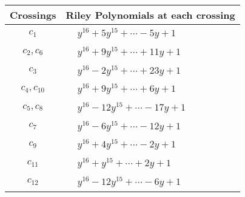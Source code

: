 \documentclass[1p]{elsarticle_modified}
\theoremstyle{definition}
\begin{document}
\begin{tabular}{m{50pt}|m{274pt}}
Crossings & \hspace{64pt}Riley Polynomials at each crossing \\
\hline $$\begin{aligned}c_{1}\end{aligned}$$&$\begin{aligned}
&y^{16}+5 y^{15}+\cdots-5 y+1
\end{aligned}$\\
\hline $$\begin{aligned}c_{2},c_{6}\end{aligned}$$&$\begin{aligned}
&y^{16}+9 y^{15}+\cdots+11 y+1
\end{aligned}$\\
\hline $$\begin{aligned}c_{3}\end{aligned}$$&$\begin{aligned}
&y^{16}-2 y^{15}+\cdots+23 y+1
\end{aligned}$\\
\hline $$\begin{aligned}c_{4},c_{10}\end{aligned}$$&$\begin{aligned}
&y^{16}+9 y^{15}+\cdots+6 y+1
\end{aligned}$\\
\hline $$\begin{aligned}c_{5},c_{8}\end{aligned}$$&$\begin{aligned}
&y^{16}-12 y^{15}+\cdots-17 y+1
\end{aligned}$\\
\hline $$\begin{aligned}c_{7}\end{aligned}$$&$\begin{aligned}
&y^{16}-6 y^{15}+\cdots-12 y+1
\end{aligned}$\\
\hline $$\begin{aligned}c_{9}\end{aligned}$$&$\begin{aligned}
&y^{16}+4 y^{15}+\cdots-2 y+1
\end{aligned}$\\
\hline $$\begin{aligned}c_{11}\end{aligned}$$&$\begin{aligned}
&y^{16}+y^{15}+\cdots+2 y+1
\end{aligned}$\\
\hline $$\begin{aligned}c_{12}\end{aligned}$$&$\begin{aligned}
&y^{16}-12 y^{15}+\cdots-6 y+1
\end{aligned}$\\
\hline
\end{tabular}\\~\\
\end{document}
